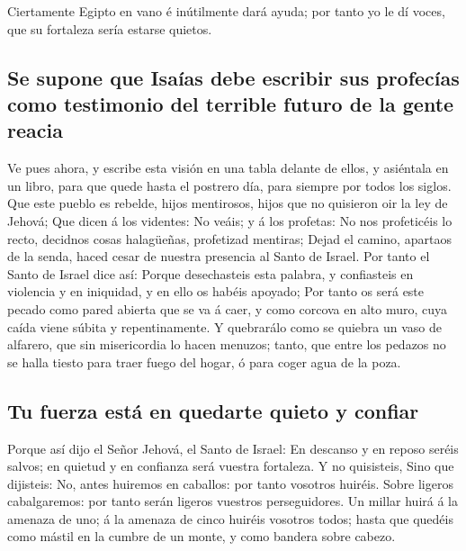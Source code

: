  Ciertamente Egipto en vano é inútilmente dará ayuda; por
tanto yo le dí voces, que su fortaleza sería estarse quietos.

\hypertarget{se-supone-que-isauxedas-debe-escribir-sus-profecuxedas-como-testimonio-del-terrible-futuro-de-la-gente-reacia}{%
\subsection{Se supone que Isaías debe escribir sus profecías como
testimonio del terrible futuro de la gente
reacia}\label{se-supone-que-isauxedas-debe-escribir-sus-profecuxedas-como-testimonio-del-terrible-futuro-de-la-gente-reacia}}

 Ve pues ahora, y escribe esta visión en una tabla delante
de ellos, y asiéntala en un libro, para que quede hasta el postrero día,
para siempre por todos los siglos.  Que este pueblo es
rebelde, hijos mentirosos, hijos que no quisieron oir la ley de Jehová;
 Que dicen á los videntes: No veáis; y á los profetas: No
nos profeticéis lo recto, decidnos cosas halagüeñas, profetizad
mentiras;  Dejad el camino, apartaos de la senda, haced
cesar de nuestra presencia al Santo de Israel.  Por tanto
el Santo de Israel dice así: Porque desechasteis esta palabra, y
confiasteis en violencia y en iniquidad, y en ello os habéis apoyado;
 Por tanto os será este pecado como pared abierta que se
va á caer, y como corcova en alto muro, cuya caída viene súbita y
repentinamente.  Y quebrarálo como se quiebra un vaso de
alfarero, que sin misericordia lo hacen menuzos; tanto, que entre los
pedazos no se halla tiesto para traer fuego del hogar, ó para coger agua
de la poza.

\hypertarget{tu-fuerza-estuxe1-en-quedarte-quieto-y-confiar}{%
\subsection{Tu fuerza está en quedarte quieto y
confiar}\label{tu-fuerza-estuxe1-en-quedarte-quieto-y-confiar}}

 Porque así dijo el Señor Jehová, el Santo de Israel: En
descanso y en reposo seréis salvos; en quietud y en confianza será
vuestra fortaleza. Y no quisisteis,  Sino que dijisteis:
No, antes huiremos en caballos: por tanto vosotros huiréis. Sobre
ligeros cabalgaremos: por tanto serán ligeros vuestros perseguidores.
 Un millar huirá á la amenaza de uno; á la amenaza de
cinco huiréis vosotros todos; hasta que quedéis como mástil en la cumbre
de un monte, y como bandera sobre cabezo.

